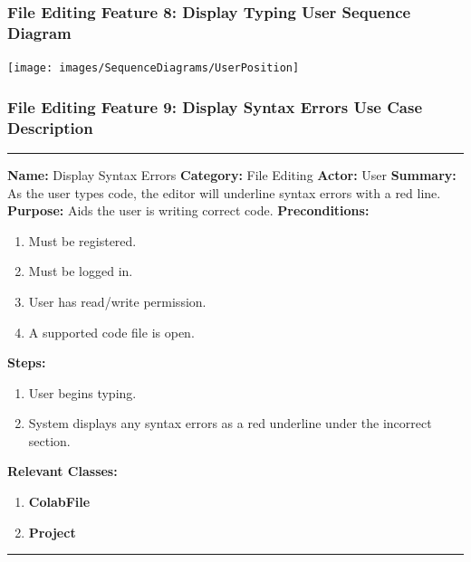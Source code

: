 \documentclass[twoside,letterpaper]{article}
\begin{document}
\subsubsection[File Editing Feature 8: Display Typing User Sequence Diagram]{\rmfamily\bfseries\color{black}
	File Editing Feature 8: Display Typing User Sequence Diagram}
\hypertarget{RefHeading22059017292}{}

\bigskip

\texttt{[image: images/SequenceDiagrams/UserPosition]}

\newpage


\subsubsection[File Editing Feature 9: Display Syntax Errors]{\rmfamily\bfseries\color{black}
	File Editing Feature 9: Display Syntax Errors Use Case Description}
\hypertarget{RefHeading22059017292}{}

\vspace{2pt}
\hrule
\vspace{8pt}
	\noindent\textbf{Name:} Display Syntax Errors \newline
	\noindent\textbf{Category:} File Editing \newline
	\noindent\textbf{Actor:} User \newline
	\noindent\textbf{Summary:} As the user types code, the editor will underline syntax errors with a red line. \newline
	\noindent\textbf{Purpose:} Aids the user is writing correct code. \newline
	\noindent\textbf{Preconditions:}
	\begin{enumerate}
		\item Must be registered.
		\item Must be logged in.
		\item User has read/write permission.
		\item A supported code file is open.
	\end{enumerate}
	\noindent\textbf{Steps:}
	\begin{enumerate}
		\item User begins typing.
		\item System displays any syntax errors as a red underline under the incorrect section.
	\end{enumerate}
	\noindent\textbf{Relevant Classes:}
	\begin{enumerate}
	    \item \textbf {ColabFile}
	    \item \textbf {Project}
	\end{enumerate}    
\vspace{8pt}
\hrule
\newpage
\end{document}
